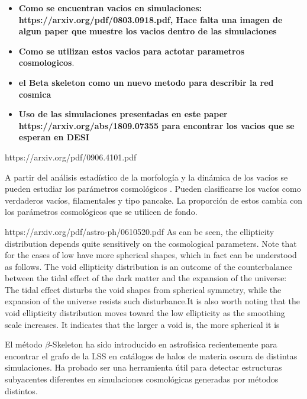 \documentclass[preprint]{aastex62}
\begin{document}
  
  
  
\begin{itemize}
  \item {\bf Como se encuentran vacios en simulaciones:
    https://arxiv.org/pdf/0803.0918.pdf, Hace falta una imagen de
    algun paper que muestre los vacios dentro de las simulaciones}
  \item {\bf Como se utilizan estos vacios para actotar parametros cosmologicos}.
  \item {\bf el Beta skeleton como un nuevo metodo para describir la
    red cosmica}
\item {\bf Uso de las simulaciones presentadas en este paper
  https://arxiv.org/abs/1809.07355 para encontrar los vacios que se
  esperan en DESI}
\end{itemize}


https://arxiv.org/pdf/0906.4101.pdf

A partir del análisis estadístico de la morfología y la dinámica de los vacíos se pueden estudiar
los parámetros cosmológicos \citep{https://arxiv.org/pdf/0906.4101.pdf}. Pueden clasificarse los vacíos
como verdaderos vacíos, filamentales y tipo pancake. La proporción de estos cambia con los parámetros
cosmológicos que se utilicen de fondo.


https://arxiv.org/pdf/astro-ph/0610520.pdf
As can be seen, the ellipticity distribution depends
quite sensitively on the cosmological parameters. Note
that for the cases of low %
have more spherical shapes, which in fact can be understood
as follows. The void ellipticity distribution is an
outcome of the counterbalance between the tidal effect of
the dark matter and the expansion of the universe: The
tidal effect disturbs the void shapes from spherical symmetry,
while the expansion of the universe resists such
disturbance.It is also worth noting that the void ellipticity
distribution moves toward the low ellipticity as the
smoothing scale increases. It indicates that the larger a
void is, the more spherical it is



  El método $\beta$-Skeleton ha sido introducido en astrofísica recientemente \citep{Fang2018} para
  encontrar el grafo de la LSS en catálogos de halos de materia oscura de distintas simulaciones.
  Ha probado ser una herramienta útil para detectar estructuras subyacentes diferentes en
  simulaciones cosmológicas generadas por métodos distintos.


\end{document}
